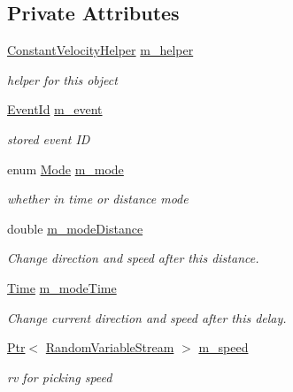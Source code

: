 \subsection*{Private Attributes}
\begin{DoxyCompactItemize}
\item 
\hyperlink{classns3_1_1ConstantVelocityHelper}{Constant\+Velocity\+Helper} \hyperlink{classns3_1_1RandomWalk2dMobilityModel_a99dea39bd85c9c004269c0d47a9eeb7b}{m\+\_\+helper}
\begin{DoxyCompactList}\small\item\em helper for this object \end{DoxyCompactList}\item 
\hyperlink{classns3_1_1EventId}{Event\+Id} \hyperlink{classns3_1_1RandomWalk2dMobilityModel_afd19bd0df37aec2cecb56502f0675991}{m\+\_\+event}
\begin{DoxyCompactList}\small\item\em stored event ID \end{DoxyCompactList}\item 
enum \hyperlink{classns3_1_1RandomWalk2dMobilityModel_a8b560f2a613c37d1bcd1c6204004801a}{Mode} \hyperlink{classns3_1_1RandomWalk2dMobilityModel_a8a753c51d371a7d0c2a394e4a7cba3cf}{m\+\_\+mode}
\begin{DoxyCompactList}\small\item\em whether in time or distance mode \end{DoxyCompactList}\item 
double \hyperlink{classns3_1_1RandomWalk2dMobilityModel_a4d4a9290a22236967822e8b8bdbe68a1}{m\+\_\+mode\+Distance}
\begin{DoxyCompactList}\small\item\em Change direction and speed after this distance. \end{DoxyCompactList}\item 
\hyperlink{classns3_1_1Time}{Time} \hyperlink{classns3_1_1RandomWalk2dMobilityModel_acdb52478fc06ca86ec0d0c5458fe1955}{m\+\_\+mode\+Time}
\begin{DoxyCompactList}\small\item\em Change current direction and speed after this delay. \end{DoxyCompactList}\item 
\hyperlink{classns3_1_1Ptr}{Ptr}$<$ \hyperlink{classns3_1_1RandomVariableStream}{Random\+Variable\+Stream} $>$ \hyperlink{classns3_1_1RandomWalk2dMobilityModel_a14c26c1ec6720474b5ecbaceba587d39}{m\+\_\+speed}
\begin{DoxyCompactList}\small\item\em rv for picking speed \end{DoxyCompactList}\item 

\end{DoxyCompactItemize}
